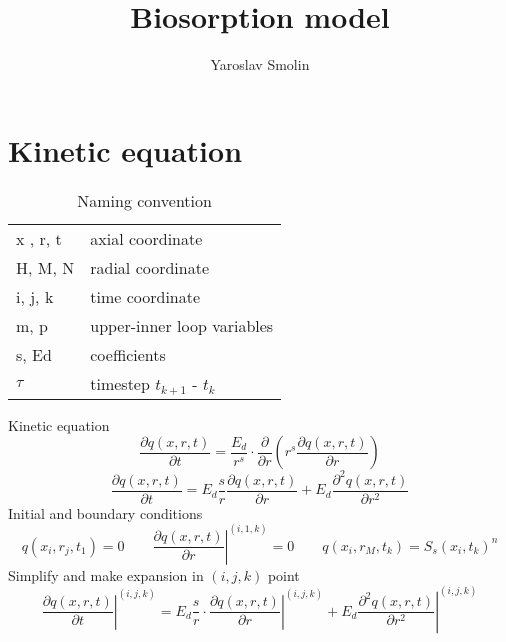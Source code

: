 \documentclass[12pt]{article}
\title{Biosorption model}
\author{Yaroslav Smolin}
\begin{document}
\maketitle	
\section{Kinetic equation}

\setlength{\abovetopsep}{4pt}
\begin{table}[!htbp]
	\caption{Naming convention}
	\begin{tabular}{l l}
		\toprule
		
		\midrule
		x , r, t  &   axial coordinate\\
		H, M, N  & radial coordinate\\
		i, j, k & time coordinate\\
		m, p & upper-inner loop variables\\
		s, Ed & coefficients\\
		$\tau$ & timestep $t_{k+1}$ - $t_k$\\
		\bottomrule
	\end{tabular}
\end{table}

Kinetic equation
\begin{equation}
\dfrac{\partial q(x,r,t)}{\partial t}=\dfrac{E_d}{r^s}\cdot\dfrac{\partial }{\partial r}\left(r^s\dfrac{\partial q(x,r,t)}{\partial r}\right)
\end{equation}
\begin{equation}
\dfrac{\partial q(x,r,t)}{\partial t}=E_d\dfrac{s}{r}\dfrac{\partial q(x,r,t)}{\partial r}  +E_d\dfrac{\partial^2q(x,r,t) }{\partial r^2}
\end{equation}
Initial and boundary conditions
\begin{equation}\label{eq:kineticB}
q(x_i, r_j, t_1) = 0
\qquad
\left.\dfrac{\partial q(x,r,t)}{\partial r}\right\vert^{(i, 1, k)}=0 
\qquad
q(x_i, r_M, t_k) = S_s(x_i, t_k)^n
\end{equation}
\indent Simplify and make expansion in $(i, j, k)$ point
\begin{equation}\label{eq:kinetic}
\left.\dfrac{\partial q(x,r,t)}{\partial t}\right\vert^{(i, j, k)}=
	E_d\dfrac{s}{r}\cdot\left.\dfrac{\partial q(x,r,t)}{\partial  r}\right\vert^{(i, j, k)} + E_d \left.\dfrac{\partial^2 q(x,r,t)}{\partial r^2}\right\vert^{(i, j, k)}
\end{equation}
\end{document}
